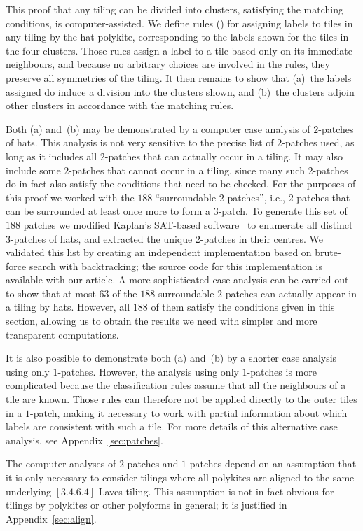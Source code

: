 This proof that any tiling can be divided into clusters, satisfying
the matching conditions, is computer-assisted.  We define rules
() for
assigning labels to tiles in any tiling by the hat polykite, corresponding
to the labels shown for the tiles in the four clusters.  Those rules
assign a label to a tile based only on its immediate neighbours, and
because no arbitrary choices are involved in the rules, they preserve
all symmetries of the tiling.  It then remains to show that (a)~the
labels assigned do induce a division into the clusters shown, and
(b)~the clusters adjoin other clusters in accordance with the matching
rules.

Both (a) and~(b) may be demonstrated by a computer case analysis of
$2$-patches of hats.  This analysis is not very
sensitive to the precise list of $2$-patches used, as long as it includes all
$2$-patches that can actually occur in a tiling.  It may also include
some $2$-patches that cannot occur in a tiling, since many such
$2$-patches do in fact also satisfy the conditions that need to be
checked.  For the purposes of this proof we worked with the $188$
``surroundable $2$-patches'', i.e., $2$-patches that can be surrounded
at least once more to form a $3$-patch.  To generate this set of $188$
patches we modified Kaplan's SAT-based software~\cite{Kaplan} to
enumerate all distinct $3$-patches of hats, and extracted the unique 
$2$-patches in their centres.  We validated this list by creating an
independent implementation based on brute-force search with backtracking;
the source code for this implementation is available with our article.
A more sophisticated case analysis can be carried out to show that at most
$63$ of the $188$ surroundable $2$-patches can actually appear in a 
tiling by hats. However, all $188$ of them satisfy the conditions given
in this section, allowing us to obtain the results we need with simpler
and more transparent computations.

It is also possible to demonstrate both (a) and~(b) by a shorter 
case analysis using only $1$-patches.  
However, the analysis using only $1$-patches is
more complicated because the classification rules assume that all the
neighbours of a tile are known.  Those rules can therefore not be applied
directly to the outer tiles in a $1$-patch, making it necessary to work
with partial information about which labels are consistent with such a
tile.  For more details of this alternative case analysis, see
Appendix~\ref{sec:patches}. 

The computer analyses of $2$-patches and $1$-patches depend on an
assumption that it is only necessary to consider tilings where all
polykites are aligned to the same underlying $[3.4.6.4]$ Laves
tiling.  This assumption is not in fact obvious for tilings by
polykites or other polyforms in general; it is justified in
Appendix~\ref{sec:align}.


